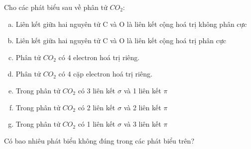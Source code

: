 \begin{bt}[CD-SBT] Cho các phát biểu sau về phân tử $CO_2$:
	\begin{enumerate}[a)]
		\item Liên kết giữa hai nguyên tử C và O là liên kết cộng hoá trị không phân cực
		\item Liên kết giữa hai nguyên tử C và O là liên kết cộng hoá trị phân cực
		\item Phân tử $CO_2$ có 4 electron hoá trị riêng.
		\item Phân tử $CO_2$ có 4 cặp electron hoá trị riêng.
		\item Trong phân tử $CO_2$ có 3 liên kết $\sigma$ và 1 liên kết $\pi$
		\item Trong phân tử $CO_2$ có 2 liên kết $\sigma$ và 2 liên kết $\pi$
		\item Trong phân tử $CO_2$ có 1 liên kết $\sigma$ và 3 liên kết $\pi$
	\end{enumerate}
	Có bao nhiêu phát biểu không đúng trong các phát biểu trên?
\end{bt}
